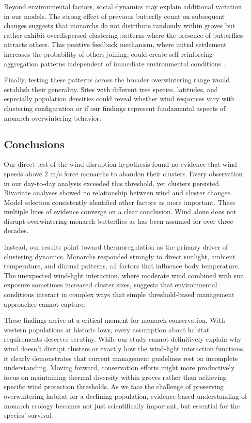 Beyond environmental factors, social dynamics may explain additional variation in our models. The strong effect of previous butterfly count on subsequent changes suggests that monarchs do not distribute randomly within groves but rather exhibit overdispersed clustering patterns where the presence of butterflies attracts others. This positive feedback mechanism, where initial settlement increases the probability of others joining, could create self-reinforcing aggregation patterns independent of immediate environmental conditions \parencite{berdahlEmergentSensingComplex2013}.

Finally, testing these patterns across the broader overwintering range would establish their generality. Sites with different tree species, latitudes, and especially population densities could reveal whether wind responses vary with clustering configuration or if our findings represent fundamental aspects of monarch overwintering behavior.

\subsection{Conclusions}

Our direct test of the wind disruption hypothesis found no evidence that wind speeds above 2 m/s force monarchs to abandon their clusters. Every observation in our day-to-day analysis exceeded this threshold, yet clusters persisted. Bivariate analyses showed no relationship between wind and cluster changes. Model selection consistently identified other factors as more important. These multiple lines of evidence converge on a clear conclusion. Wind alone does not disrupt overwintering monarch butterflies as has been assumed for over three decades.

Instead, our results point toward thermoregulation as the primary driver of clustering dynamics. Monarchs responded strongly to direct sunlight, ambient temperature, and diurnal patterns, all factors that influence body temperature. The unexpected wind-light interaction, where moderate wind combined with sun exposure sometimes increased cluster sizes, suggests that environmental conditions interact in complex ways that simple threshold-based management approaches cannot capture.

These findings arrive at a critical moment for monarch conservation. With western populations at historic lows, every assumption about habitat requirements deserves scrutiny. While our study cannot definitively explain why wind doesn't disrupt clusters or exactly how the wind-light interaction functions, it clearly demonstrates that current management guidelines rest on incomplete understanding. Moving forward, conservation efforts might more productively focus on maintaining thermal diversity within groves rather than achieving specific wind protection thresholds. As we face the challenge of preserving overwintering habitat for a declining population, evidence-based understanding of monarch ecology becomes not just scientifically important, but essential for the species' survival.